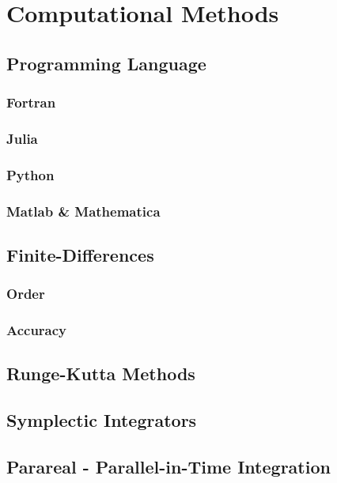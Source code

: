 \documentclass{report}
\begin{document}
\chapter{Computational Methods}

    \section{Programming Language}

        \subsection{Fortran}

        \subsection{Julia}

        \subsection{Python}

        \subsection{Matlab \& Mathematica}

    \section{Finite-Differences}

        \subsection{Order}

        \subsection{Accuracy}

    \section{Runge-Kutta Methods}

    \section{Symplectic Integrators}

    \section{Parareal - Parallel-in-Time Integration}
\end{document}
